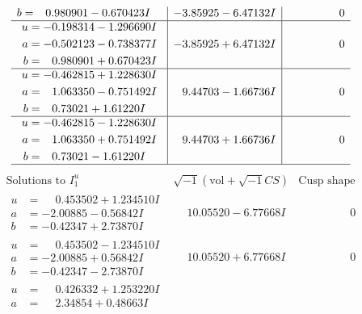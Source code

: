 \documentclass[1p]{elsarticle_modified}
\theoremstyle{definition}
\newcommand{\I}{\sqrt{-1}}
\begin{document}
$$\begin{array}{c|c|c}
\begin{aligned}
b &= \phantom{-}0.980901 - 0.670423 I\end{aligned}
 & -3.85925 - 6.47132 I & \phantom{-0.000000 } 0 \\ \hline\begin{aligned}
u &= -0.198314 - 1.296690 I \\
a &= -0.502123 - 0.738377 I \\
b &= \phantom{-}0.980901 + 0.670423 I\end{aligned}
 & -3.85925 + 6.47132 I & \phantom{-0.000000 } 0 \\ \hline\begin{aligned}
u &= -0.462815 + 1.228630 I \\
a &= \phantom{-}1.063350 - 0.751492 I \\
b &= \phantom{-}0.73021 + 1.61220 I\end{aligned}
 & \phantom{-}9.44703 - 1.66736 I & \phantom{-0.000000 } 0 \\ \hline\begin{aligned}
u &= -0.462815 - 1.228630 I \\
a &= \phantom{-}1.063350 + 0.751492 I \\
b &= \phantom{-}0.73021 - 1.61220 I\end{aligned}
 & \phantom{-}9.44703 + 1.66736 I & \phantom{-0.000000 } 0\\
 \hline 
 \end{array}$$\newpage$$\begin{array}{c|c|c}  
\text{Solutions to }I^u_{1}& \I (\text{vol} + \sqrt{-1}CS) & \text{Cusp shape}\\
 \hline 
\begin{aligned}
u &= \phantom{-}0.453502 + 1.234510 I \\
a &= -2.00885 - 0.56842 I \\
b &= -0.42347 + 2.73870 I\end{aligned}
 & \phantom{-}10.05520 - 6.77668 I & \phantom{-0.000000 } 0 \\ \hline\begin{aligned}
u &= \phantom{-}0.453502 - 1.234510 I \\
a &= -2.00885 + 0.56842 I \\
b &= -0.42347 - 2.73870 I\end{aligned}
 & \phantom{-}10.05520 + 6.77668 I & \phantom{-0.000000 } 0 \\ \hline\begin{aligned}
u &= \phantom{-}0.426332 + 1.253220 I \\
a &= \phantom{-}2.34854 + 0.48663 I \\

\end{aligned}
\end{array}$$
\end{document}
